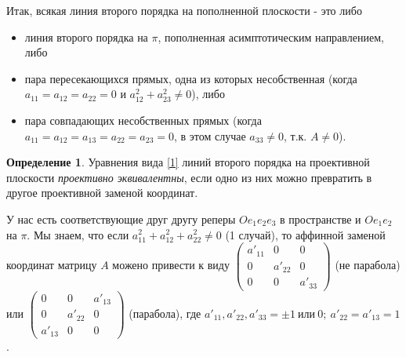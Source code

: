 \documentclass[a4paper, 12pt]{article}
\theoremstyle{definition}
\newtheorem*{definition}{Определение}
\begin{document}
Итак, всякая линия второго порядка на пополненной плоскости - это либо
\begin{itemize}
    \item линия второго порядка на $\pi$, пополненная асимптотическим направлением, либо
    \item пара пересекающихся прямых, одна из которых несобственная (когда $a_{11} = a_{12} = a_{22} = 0$ и $a^2_{12} + a^2_{23} \neq 0$), либо
    \item пара совпадающих несобственных прямых (когда $a_{11} = a_{12} = a_{13} = a_{22} = a_{23} = 0$, в этом случае $a_{33} \neq 0$, т.к. $A \neq 0$).
\end{itemize}

\begin{definition}
    Уравнения вида \eqref{1} линий второго порядка на проективной плоскости \textit{проективно эквивалентны}, если одно из них можно превратить в другое проективной заменой координат.
\end{definition}

У нас есть соответствующие друг другу реперы $Oe_1e_2e_3$ в пространстве и $Oe_1e_2$ на $\pi$. Мы знаем, что если $a^2_{11} + a^2_{12} + a^2_{22} \neq 0$ (1 случай), то аффинной заменой координат матрицу $A$ можено привести к виду $\begin{pmatrix} a'_{11}&0&0 \\ 0&a'_{22}&0 \\ 0&0&a'_{33} \end{pmatrix}$ (не парабола) или $\begin{pmatrix} 0&0&a'_{13} \\ 0&a'_{22}&0 \\ a'_{13}&0&0 \end{pmatrix}$ (парабола), где $a'_{11}, a'_{22}, a'_{33} = \pm 1 \ \text{или} \ 0; \ a'_{22} = a'_{13} = 1$.
\end{document}
